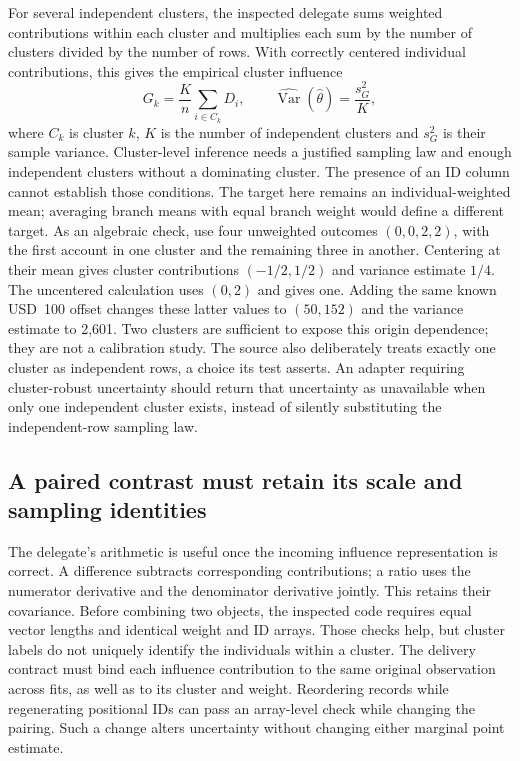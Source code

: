 For several independent clusters, the inspected delegate sums weighted
contributions within each cluster and multiplies each sum by the number of
clusters divided by the number of rows. With correctly centered individual
contributions, this gives the empirical cluster influence
\begin{equation}
 G_k=\frac{K}{n}\sum_{i\in C_k}D_i,\qquad
 \widehat{\operatorname{Var}}(\widehat\theta)
       =\frac{s_G^2}{K},
 \label{rel23:cluster-influence}
\end{equation}
where $C_k$ is cluster $k$, $K$ is the number of independent clusters and
$s_G^2$ is their sample variance. Cluster-level inference needs a justified
sampling law and enough independent clusters without a dominating cluster.
The presence of an ID column cannot establish those conditions. The target
here remains an individual-weighted mean; averaging branch means with equal
branch weight would define a different target. As an algebraic check, use four unweighted outcomes
$(0,0,2,2)$, with the first account in one cluster and the remaining three in
another. Centering at their mean gives cluster contributions $(-1/2,1/2)$
and variance estimate $1/4$. The uncentered calculation uses $(0,2)$ and gives
one. Adding the same known USD~100 offset changes these latter values to
$(50,152)$ and the variance estimate to 2,601. Two clusters are sufficient to
expose this origin dependence; they are not a calibration study. The source
also deliberately treats exactly one cluster as independent rows, a choice
its test asserts. An adapter requiring cluster-robust uncertainty should
return that uncertainty as unavailable when only one independent cluster
exists, instead of silently substituting the independent-row sampling law.
\citep{rel23ife,rel23ifewitness}

\subsection{A paired contrast must retain its scale and sampling identities}
\label{rel23:ife-contrasts}

The delegate's arithmetic is useful once the incoming influence representation
is correct. A difference subtracts corresponding contributions; a ratio uses
the numerator derivative and the denominator derivative jointly. This retains
their covariance. Before combining two objects, the inspected code requires
equal vector lengths and identical weight and ID arrays. Those checks help,
but cluster labels do not uniquely identify the individuals within a cluster.
The delivery contract must bind each influence contribution to the same
original observation across fits, as well as to its cluster and weight.
Reordering records while regenerating positional IDs can pass an array-level
check while changing the pairing. Such a change alters uncertainty without
changing either marginal point estimate. \citep{rel23ife}

